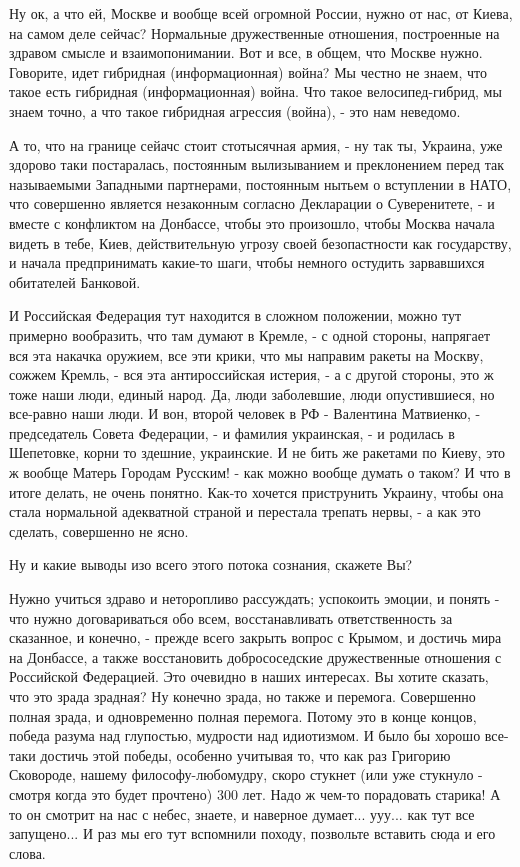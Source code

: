 Ну ок, а что ей, Москве и вообще всей огромной России, нужно от нас, от Киева,
на самом деле сейчас?  Нормальные дружественные отношения, построенные на
здравом смысле и взаимопонимании. Вот и все, в общем, что Москве нужно.
Говорите, идет гибридная (информационная) война? Мы честно не знаем, что такое
есть гибридная (информационная) война. Что такое велосипед-гибрид, мы знаем
точно, а что такое гибридная агрессия (война), - это нам неведомо. 

А то, что на границе сейачс стоит стотысячная армия, - ну так ты, Украина, уже
здорово таки постаралась, постоянным вылизыванием и преклонением перед так
называемыми Западными партнерами, постоянным нытьем о вступлении в НАТО, что
совершенно является незаконным согласно Декларации о Суверенитете, - и вместе с
конфликтом на Донбассе, чтобы это произошло, чтобы Москва начала видеть в тебе,
Киев, действительную угрозу своей безопастности как государству, и начала
предпринимать какие-то шаги, чтобы немного остудить зарвавшихся обитателей
Банковой.

И Российская Федерация тут находится в сложном положении, можно тут примерно
вообразить, что там думают в Кремле, - с одной стороны, напрягает вся эта
накачка оружием, все эти крики, что мы направим ракеты на Москву, сожжем
Кремль, - вся эта антироссийская истерия, - а с другой стороны, это ж тоже наши
люди, единый народ. Да, люди заболевшие, люди опустившиеся, но все-равно наши
люди.  И вон, второй человек в РФ - Валентина Матвиенко, - председатель Совета
Федерации, - и фамилия украинская, - и родилась в Шепетовке, корни то здешние,
украинские. И не бить же ракетами по Киеву, это ж вообще Матерь Городам
Русским! - как можно вообще думать о таком? И что в итоге делать, не очень
понятно. Как-то хочется приструнить Украину, чтобы она стала нормальной
адекватной страной и перестала трепать нервы, - а как это сделать, совершенно
не ясно.

Ну и какие выводы изо всего этого потока сознания, скажете Вы? 

Нужно учиться здраво и неторопливо рассуждать; успокоить эмоции, и понять - что
нужно договариваться обо всем, восстанавливать ответственность за сказанное, и
конечно, - прежде всего закрыть вопрос с Крымом, и достичь мира на Донбассе, а
также восстановить добрососедские дружественные отношения с Российской
Федерацией. Это очевидно в наших интересах. Вы хотите сказать, что это зрада
зрадная? Ну конечно зрада, но также и перемога. Совершенно полная зрада, и
одновременно полная перемога.  Потому это в конце концов, победа разума над
глупостью, мудрости над идиотизмом. И было бы хорошо все-таки достичь этой
победы, особенно учитывая то, что как раз Григорию Сковороде, нашему
философу-любомудру, скоро стукнет (или уже стукнуло - смотря когда это будет
прочтено) 300 лет. Надо ж чем-то порадовать старика! А то он смотрит на нас с
небес, знаете, и наверное думает...  ууу...  как тут все запущено... И раз мы
его тут вспомнили походу, позвольте вставить сюда и его слова. 

